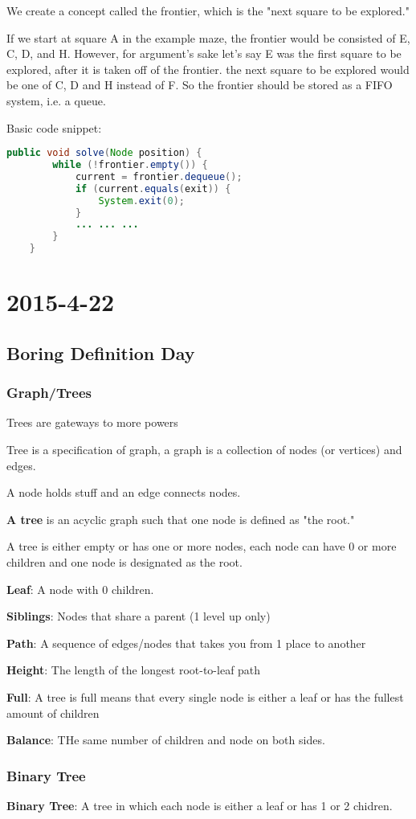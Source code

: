 \documentclass [12 pt, twoside] {article}
\begin{document}
We create a concept called the frontier, which is the "next square to be
explored."

If we start at square A in the example maze, the frontier would be consisted of
E, C, D, and H. However, for argument's sake let's say E was the first square to
be explored, after it is taken off of the frontier. the next square to be
explored would be one of C, D and H instead of F. So the frontier should be
stored as a FIFO system, i.e. a queue.

Basic code snippet:
\begin{lstlisting}[language=java]
    public void solve(Node position) {
        while (!frontier.empty()) {
            current = frontier.dequeue();
            if (current.equals(exit)) {
                System.exit(0);
            }
            ... ... ...
        }
    }
\end{lstlisting}

\section{2015-4-22}
\subsection{Boring Definition Day}
\subsubsection{Graph/Trees}
Trees are gateways to more powers

Tree is a specification of graph, a graph is a collection of nodes (or vertices) and edges.

A node holds stuff and an edge connects nodes.


\textbf{A tree} is an acyclic graph such that one node is defined as "the root."

A tree is either empty or has one or more nodes, each node can have 0 or more
children and one node is designated as the root.

\textbf{Leaf}: A node with 0 children.

\textbf{Siblings}: Nodes that share a parent (1 level up only)

\textbf{Path}: A sequence of edges/nodes that takes you from 1 place to another

\textbf{Height}: The length of the longest root-to-leaf path

\textbf{Full}: A tree is full means that every single node is either a leaf or
has the fullest amount of children

\textbf{Balance}: THe same number of children and node on both sides.

\subsubsection{Binary Tree}
\textbf{Binary Tree}: A tree in which each node is either a leaf or has 1 or 2
chidren.
\end{document}
